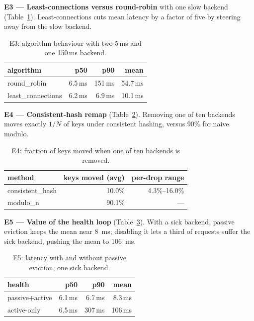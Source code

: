 \documentclass[11pt,a4paper]{report}
\begin{document}
\textbf{E3 --- Least-connections versus round-robin} with one slow backend
(Table~\ref{tab:e3}). Least-connections cuts mean latency by a factor of five by steering away
from the slow backend.

\begin{table}[htbp]
\centering
\caption{E3: algorithm behaviour with two 5\,ms and one 150\,ms backend.}
\label{tab:e3}
\begin{tabular}{lrrr}
\toprule
algorithm & p50 & p90 & mean\\
\midrule
round\_robin       & 6.5\,ms & 151\,ms & 54.7\,ms\\
least\_connections & 6.2\,ms & 6.9\,ms & 10.1\,ms\\
\bottomrule
\end{tabular}
\end{table}

\textbf{E4 --- Consistent-hash remap} (Table~\ref{tab:e4}). Removing one of ten backends moves
exactly $1/N$ of keys under consistent hashing, versus 90\% for naive modulo.

\begin{table}[htbp]
\centering
\caption{E4: fraction of keys moved when one of ten backends is removed.}
\label{tab:e4}
\begin{tabular}{lrr}
\toprule
method & keys moved (avg) & per-drop range\\
\midrule
consistent\_hash & 10.0\% & 4.3\%--16.0\%\\
modulo\_n        & 90.1\% & ---\\
\bottomrule
\end{tabular}
\end{table}

\textbf{E5 --- Value of the health loop} (Table~\ref{tab:e5}). With a sick backend, passive
eviction keeps the mean near 8~ms; disabling it lets a third of requests suffer the sick backend,
pushing the mean to 106~ms.

\begin{table}[htbp]
\centering
\caption{E5: latency with and without passive eviction, one sick backend.}
\label{tab:e5}
\begin{tabular}{lrrr}
\toprule
health & p50 & p90 & mean\\
\midrule
passive+active & 6.1\,ms & 6.7\,ms & 8.3\,ms\\
active-only    & 6.5\,ms & 307\,ms & 106\,ms\\
\bottomrule
\end{tabular}
\end{table}
\end{document}

